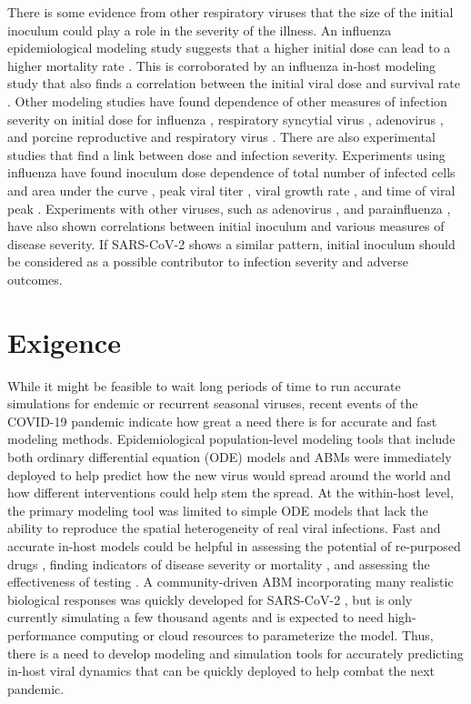 There is some evidence from other respiratory viruses that the size of the initial inoculum could play a role in the severity of the illness. An influenza epidemiological modeling study suggests that a higher initial dose can lead to a higher mortality rate \cite{paulo10}. This is corroborated by an influenza in-host modeling study that also finds a correlation between the initial viral dose and survival rate \cite{price15}. Other modeling studies have found dependence of other measures of infection severity on initial dose for influenza \cite{moore20}, respiratory syncytial virus \cite{wethington19}, adenovirus \cite{li14}, and porcine reproductive and respiratory virus \cite{go19}. There are also experimental studies that find a link between dose and infection severity. Experiments using influenza have found inoculum dose dependence of total number of infected cells and area under the curve \cite{manicassamy10}, peak viral titer \cite{ginsberg52,iida63,ottolini05}, viral growth rate \cite{ginsberg52}, and time of viral peak \cite{iida63,ginsberg52}. Experiments with other viruses, such as adenovirus \cite{prince93}, and parainfluenza \cite{ottolini96}, have also shown correlations between initial inoculum and various measures of disease severity. If SARS-CoV-2 shows a similar pattern, initial inoculum should be considered as a possible contributor to infection severity and adverse outcomes.

\section{Exigence}
While it might be feasible to wait long periods of time to run accurate simulations for endemic or recurrent seasonal viruses, recent events of the COVID-19 pandemic indicate how great a need there is for accurate and fast modeling methods. Epidemiological population-level modeling tools that include both ordinary differential equation (ODE) models \cite{li20,ngonghala20} and ABMs \cite{ying21,sneppen21,kano21} were immediately deployed to help predict how the new virus would spread around the world and how different interventions could help stem the spread. At the within-host level, the primary modeling tool was limited to simple ODE models \cite{goncalves20,wang20model,hernandez20,dogra20} that lack the ability to reproduce the spatial heterogeneity of real viral infections. Fast and accurate in-host models could be helpful in assessing the potential of re-purposed drugs \cite{czuppon21,goncalves20,dodds20}, finding indicators of disease severity or mortality \cite{neant21}, and assessing the effectiveness of testing \cite{ejima21}. A community-driven ABM incorporating many realistic biological responses was quickly developed for SARS-CoV-2 \cite{getz21}, but is only currently simulating a few thousand agents and is expected to need high-performance computing or cloud resources to parameterize the model. Thus, there is a need to develop modeling and simulation tools for accurately predicting in-host viral dynamics that can be quickly deployed to help combat the next pandemic.

